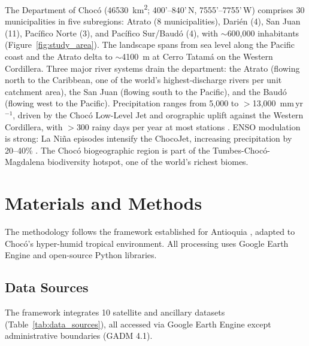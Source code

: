 \documentclass{article}
\begin{document}
The Department of Choc\'o (\SI{46530}{\kilo\metre\squared}; 4\textdegree{}00'--8\textdegree{}40'\,N, 75\textdegree{}55'--77\textdegree{}55'\,W) comprises 30 municipalities in five subregions: Atrato (8 municipalities), Dari\'en (4), San Juan (11), Pac\'ifico Norte (3), and Pac\'ifico Sur/Baud\'o (4), with $\sim$600,000 inhabitants (Figure~\ref{fig:study_area}). The landscape spans from sea level along the Pacific coast and the Atrato delta to $\sim$\SI{4100}{\metre} at Cerro Tatam\'a on the Western Cordillera. Three major river systems drain the department: the Atrato (flowing north to the Caribbean, one of the world's highest-discharge rivers per unit catchment area), the San Juan (flowing south to the Pacific), and the Baud\'o (flowing west to the Pacific). Precipitation ranges from 5,000 to $>$13,000~mm\,yr$^{-1}$, driven by the Choc\'o Low-Level Jet \citep{Poveda2023} and orographic uplift against the Western Cordillera, with $>$300 rainy days per year at most stations \citep{Urrea2019}. ENSO modulation is strong: La Ni\~na episodes intensify the ChocoJet, increasing precipitation by 20--40\% \citep{Poveda2001, Mejia2021}. The Choc\'o biogeographic region is part of the Tumbes-Choc\'o-Magdalena biodiversity hotspot, one of the world's richest biomes.

\section{Materials and Methods}
\label{sec:methods}

The methodology follows the framework established for Antioquia \citep{EspinalMaya2026}, adapted to Choc\'o's hyper-humid tropical environment. All processing uses Google Earth Engine \citep{Gorelick2017} and open-source Python libraries.

\subsection{Data Sources}

The framework integrates 10 satellite and ancillary datasets (Table~\ref{tab:data_sources}), all accessed via Google Earth Engine except administrative boundaries (GADM 4.1).
\end{document}
